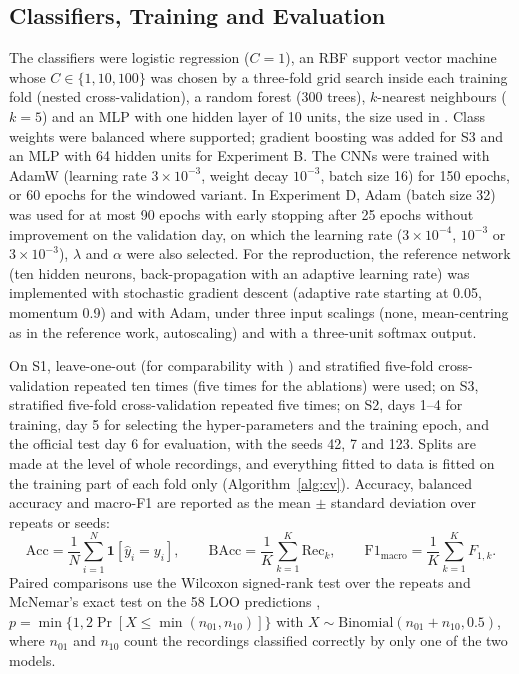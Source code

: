 \documentclass[12pt]{article}
\begin{document}
\subsection{Classifiers, Training and Evaluation}

The classifiers were logistic regression ($C = 1$), an RBF support vector machine whose $C \in \{1, 10, 100\}$ was chosen by a three-fold grid search inside each training fold (nested cross-validation), a random forest (300 trees), $k$-nearest neighbours ($k = 5$) and an MLP with one hidden layer of 10 units, the size used in \cite{rodriguez2010electronic}. Class weights were balanced where supported; gradient boosting was added for S3 and an MLP with 64 hidden units for Experiment B. The CNNs were trained with AdamW (learning rate $3 \times 10^{-3}$, weight decay $10^{-3}$, batch size 16) for 150 epochs, or 60 epochs for the windowed variant. In Experiment D, Adam (batch size 32) was used for at most 90 epochs with early stopping after 25 epochs without improvement on the validation day, on which the learning rate ($3 \times 10^{-4}$, $10^{-3}$ or $3 \times 10^{-3}$), $\lambda$ and $\alpha$ were also selected. For the reproduction, the reference network (ten hidden neurons, back-propagation with an adaptive learning rate) was implemented with stochastic gradient descent (adaptive rate starting at 0.05, momentum 0.9) and with Adam, under three input scalings (none, mean-centring as in the reference work, autoscaling) and with a three-unit softmax output.

On S1, leave-one-out (for comparability with \cite{rodriguez2010electronic}) and stratified five-fold cross-validation repeated ten times (five times for the ablations) were used; on S3, stratified five-fold cross-validation repeated five times; on S2, days 1--4 for training, day 5 for selecting the hyper-parameters and the training epoch, and the official test day 6 for evaluation, with the seeds 42, 7 and 123. Splits are made at the level of whole recordings, and everything fitted to data is fitted on the training part of each fold only (Algorithm~\ref{alg:cv}). Accuracy, balanced accuracy and macro-F1 are reported as the mean $\pm$ standard deviation over repeats or seeds:
\begin{equation}
\mathrm{Acc} = \frac{1}{N}\sum_{i=1}^{N} \mathbf{1}[\hat{y}_i = y_i], \qquad \mathrm{BAcc} = \frac{1}{K}\sum_{k=1}^{K} \mathrm{Rec}_k, \qquad \mathrm{F1}_{\mathrm{macro}} = \frac{1}{K}\sum_{k=1}^{K} F_{1,k}.
\end{equation}
Paired comparisons use the Wilcoxon signed-rank test over the repeats \cite{demsar2006statistical} and McNemar's exact test on the 58 LOO predictions \cite{dietterich1998approximate}, $p = \min\{1, 2\Pr[X \leq \min(n_{01}, n_{10})]\}$ with $X \sim \mathrm{Binomial}(n_{01} + n_{10}, 0.5)$, where $n_{01}$ and $n_{10}$ count the recordings classified correctly by only one of the two models.
\end{document}
